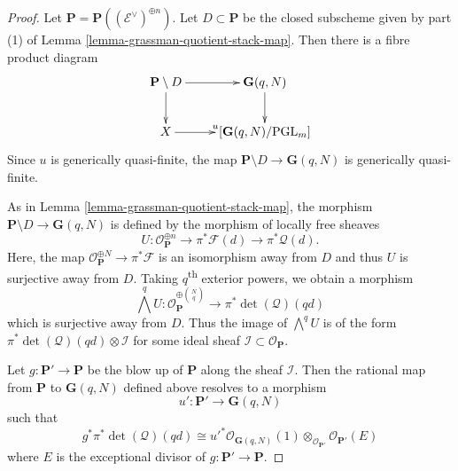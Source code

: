 \begin{proof}
Let $\mathbf{P} = \mathbf{P}((\mathcal{E}^\vee)^{\oplus n})$.
Let $D \subset \mathbf{P}$ be the closed subscheme given by part (1) of
Lemma \ref{lemma-grassman-quotient-stack-map}.
Then there is a fibre product diagram
$$
\xymatrix{
  \mathbf{P} \setminus D \ar[r] \ar[d] & \mathbf{G}(q,N) \ar[d] \\
  X \ar[r]^u & [\mathbf{G}(q,N)/\mathrm{PGL}_m]
}
$$
Since $u$ is generically quasi-finite, the map
$\mathbf{P} \setminus D \to \mathbf{G}(q,N)$ is generically quasi-finite.

As in Lemma \ref{lemma-grassman-quotient-stack-map},
the morphism $\mathbf{P} \setminus D \to \mathbf{G}(q,N)$ is defined by
the morphism of locally free sheaves
$$
  U : \mathcal{O}_{\mathbf{P}}^{\oplus n} \to \pi^*\mathcal{F}(d)
                                          \to \pi^*\mathcal{Q}(d).
$$
Here, the map $\mathcal{O}_{\mathbf{P}}^{\oplus N} \to \pi^*\mathcal{F}$ is
an isomorphism away from $D$ and thus $U$ is surjective away from $D$.
Taking $q$\textsuperscript{th} exterior powers, we obtain a morphism
$$
  \bigwedge^q U : \mathcal{O}_{\mathbf{P}}^{\oplus \binom{N}{q}} \to
    \pi^*\det(\mathcal{Q})(qd)
$$
which is surjective away from $D$.
Thus the image of $\bigwedge^q U$ is of the form
$\pi^*\det(\mathcal{Q})(qd) \otimes \mathcal{I}$ for some ideal sheaf
$\mathcal{I} \subset \mathcal{O}_{\mathbf{P}}$.

Let $g : \mathbf{P}' \to \mathbf{P}$ be the blow up of $\mathbf{P}$ along the
sheaf $\mathcal{I}$.
Then the rational map from $\mathbf{P}$ to $\mathbf{G}(q,N)$ defined above
resolves to a morphism
$$
  u' : \mathbf{P}' \to \mathbf{G}(q,N)
$$
such that
$$
  g^*\pi^*\det(\mathcal{Q})(qd) \cong
    u'^*\mathcal{O}_{\mathbf{G}(q,N)}(1)
      \otimes_{\mathcal{O}_{\mathbf{P}'}}
    \mathcal{O}_{\mathbf{P}'}(E)
$$
where $E$ is the exceptional divisor of $g : \mathbf{P}' \to \mathbf{P}$.


\end{proof}
